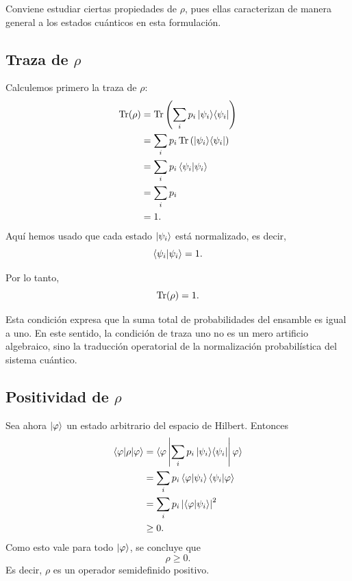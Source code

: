 \documentclass[../main.tex]{subfiles}
\begin{document}
Conviene estudiar ciertas propiedades de $\rho$, pues ellas caracterizan de manera general a los estados cuánticos en esta formulación.

\subsection*{Traza de $\rho$}

Calculemos primero la traza de $\rho$:
\begin{align*}
    \Tr(\rho)
    &= \Tr\left(\sum_i p_i \ket{\psi_i}\!\bra{\psi_i}\right) \\
    &= \sum_i p_i \Tr\left(\ket{\psi_i}\!\bra{\psi_i}\right) \\
    &= \sum_i p_i \braket{\psi_i|\psi_i} \\
    &= \sum_i p_i \\
    &= 1.
\end{align*}
Aquí hemos usado que cada estado $\ket{\psi_i}$ está normalizado, es decir,
\begin{equation*}
    \braket{\psi_i|\psi_i}=1.
\end{equation*}

Por lo tanto,
\begin{equation*}
    \Tr(\rho)=1.
\end{equation*}

Esta condición expresa que la suma total de probabilidades del ensamble es igual a uno. En este sentido, la condición de traza uno no es un mero artificio algebraico, sino la traducción operatorial de la normalización probabilística del sistema cuántico.

\subsection*{Positividad de $\rho$}

Sea ahora $\ket{\varphi}$ un estado arbitrario del espacio de Hilbert. Entonces
\begin{align*}
    \braket{\varphi|\rho|\varphi}
    &= \braket{\varphi\left|\sum_i p_i \ket{\psi_i}\!\bra{\psi_i}\right|\varphi} \\
    &= \sum_i p_i \braket{\varphi|\psi_i}\braket{\psi_i|\varphi} \\
    &= \sum_i p_i \left|\braket{\varphi|\psi_i}\right|^2 \\
    &\geq 0.
\end{align*}
Como esto vale para todo $\ket{\varphi}$, se concluye que
\begin{equation*}
    \rho \geq 0.
\end{equation*}
Es decir, $\rho$ es un operador semidefinido positivo.
\end{document}
